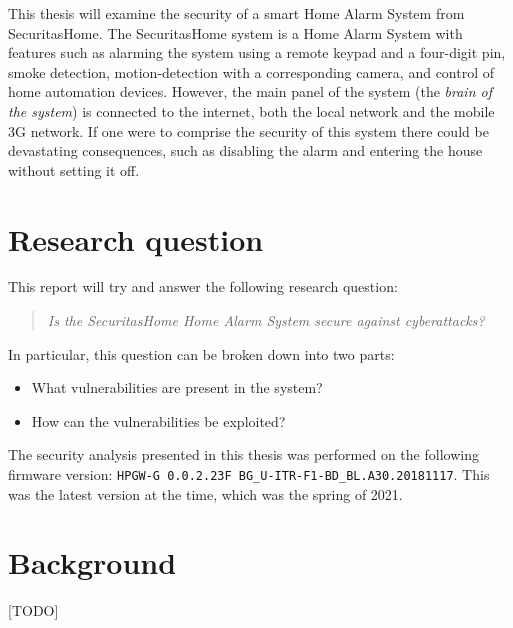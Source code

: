 This thesis will examine the security of a smart Home Alarm System from SecuritasHome. The SecuritasHome system is a Home Alarm System with features such as alarming the system using a remote keypad and a four-digit pin, smoke detection, motion-detection with a corresponding camera, and control of home automation devices. However, the main panel of the system (the \textit{brain of the system}) is connected to the internet, both the local network and the mobile 3G network. If one were to comprise the security of this system there could be devastating consequences, such as disabling the alarm and entering the house without setting it off.

\section{Research question} \label{ch:intro:research-question}
This report will try and answer the following research question:

\begin{quote}
    \textit{Is the SecuritasHome Home Alarm System secure against cyberattacks?}
\end{quote}

\noindent In particular, this question can be broken down into two parts:

\begin{itemize}
    \item What vulnerabilities are present in the system?
    \item How can the vulnerabilities be exploited?
\end{itemize}

\noindent The security analysis presented in this thesis was performed on the following firmware version: \texttt{HPGW-G 0.0.2.23F BG\_U-ITR-F1-BD\_BL.A30.20181117}. This was the latest version at the time, which was the spring of 2021.

\section{Background} \label{ch:intro:background}
[TODO]

